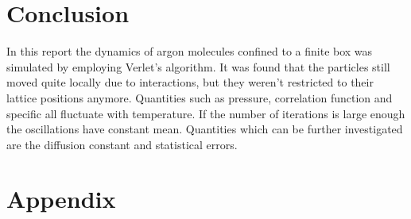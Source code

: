 \documentclass[10pt,a4paper,notitlepage]{article}
\begin{document}
\section{Conclusion}

In this report the dynamics of argon molecules confined to a finite box was simulated by employing Verlet's algorithm. It was found that the particles still moved quite locally due to interactions, but they weren't restricted to their lattice positions anymore. Quantities such as pressure, correlation function and specific all fluctuate with temperature. If the number of iterations is large enough the oscillations have constant mean. Quantities which can be further investigated are the diffusion constant and statistical errors. 

\section{Appendix}

 









\end{document}

